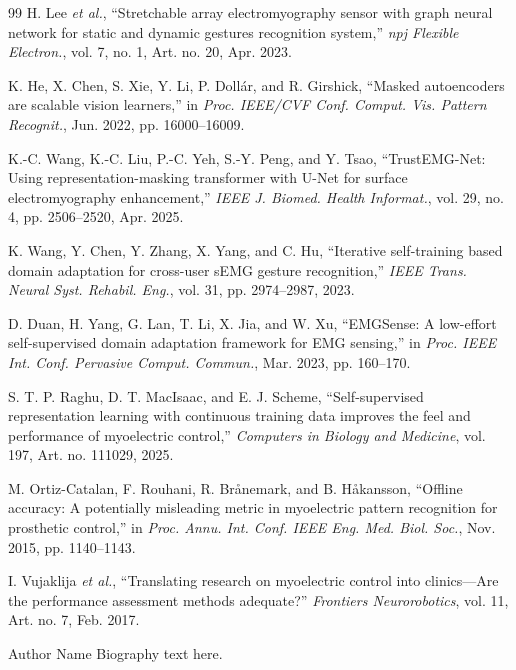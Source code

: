 \documentclass[journal]{IEEEtran}
\begin{document}
\begin{thebibliography}{99}
H. Lee \emph{et al.},
``Stretchable array electromyography sensor with graph neural network for static and dynamic gestures recognition system,''
\emph{npj Flexible Electron.}, vol. 7, no. 1, Art. no. 20, Apr. 2023.

K. He, X. Chen, S. Xie, Y. Li, P. Doll{\'a}r, and R. Girshick,
``Masked autoencoders are scalable vision learners,''
in \emph{Proc. IEEE/CVF Conf. Comput. Vis. Pattern Recognit.}, Jun. 2022, pp. 16000--16009.

K.-C. Wang, K.-C. Liu, P.-C. Yeh, S.-Y. Peng, and Y. Tsao,
``TrustEMG-Net: Using representation-masking transformer with U-Net for surface electromyography enhancement,''
\emph{IEEE J. Biomed. Health Informat.}, vol. 29, no. 4, pp. 2506--2520, Apr. 2025.

K. Wang, Y. Chen, Y. Zhang, X. Yang, and C. Hu,
``Iterative self-training based domain adaptation for cross-user sEMG gesture recognition,''
\emph{IEEE Trans. Neural Syst. Rehabil. Eng.}, vol. 31, pp. 2974--2987, 2023.

D. Duan, H. Yang, G. Lan, T. Li, X. Jia, and W. Xu,
``EMGSense: A low-effort self-supervised domain adaptation framework for EMG sensing,''
in \emph{Proc. IEEE Int. Conf. Pervasive Comput. Commun.}, Mar. 2023, pp. 160--170.

S. T. P. Raghu, D. T. MacIsaac, and E. J. Scheme,
``Self-supervised representation learning with continuous training data improves the feel and performance of myoelectric control,''
\emph{Computers in Biology and Medicine}, vol. 197, Art. no. 111029, 2025.

M. Ortiz-Catalan, F. Rouhani, R. Br{\aa}nemark, and B. H{\aa}kansson,
``Offline accuracy: A potentially misleading metric in myoelectric pattern recognition for prosthetic control,''
in \emph{Proc. Annu. Int. Conf. IEEE Eng. Med. Biol. Soc.}, Nov. 2015, pp. 1140--1143.

I. Vujaklija \emph{et al.},
``Translating research on myoelectric control into clinics---Are the performance assessment methods adequate?''
\emph{Frontiers Neurorobotics}, vol. 11, Art. no. 7, Feb. 2017.

\end{thebibliography}

\begin{IEEEbiographynophoto}{Author Name}
Biography text here.
\end{IEEEbiographynophoto}
\end{document}
